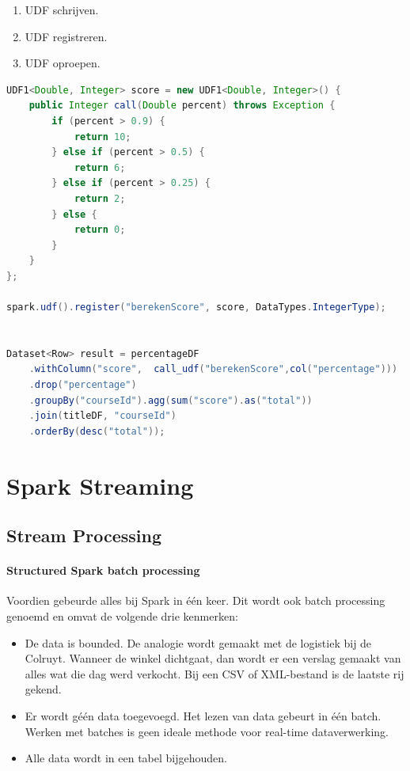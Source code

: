 \documentclass[a4paper,10pt,twoside]{report}
\begin{document}
\begin{enumerate}
	\item UDF schrijven.
	\item UDF registreren.
	\item UDF oproepen.
\end{enumerate}

\begin{lstlisting}[language=Java]
UDF1<Double, Integer> score = new UDF1<Double, Integer>() {
	public Integer call(Double percent) throws Exception {
		if (percent > 0.9) {
			return 10;
		} else if (percent > 0.5) {
			return 6;
		} else if (percent > 0.25) {
			return 2;
		} else {
			return 0;
		}
	}
};

spark.udf().register("berekenScore", score, DataTypes.IntegerType);


Dataset<Row> result = percentageDF
	.withColumn("score",  call_udf("berekenScore",col("percentage")))
	.drop("percentage")
	.groupBy("courseId").agg(sum("score").as("total"))
	.join(titleDF, "courseId")
	.orderBy(desc("total"));
\end{lstlisting}

\chapter{Spark Streaming}

\section{Stream Processing}

\subsubsection{Structured Spark batch processing}

Voordien gebeurde alles bij Spark in één keer. Dit wordt ook batch processing genoemd en omvat de volgende drie kenmerken:

\begin{itemize}
	\item De data is bounded. De analogie wordt gemaakt met de logistiek bij de Colruyt. Wanneer de winkel dichtgaat, dan wordt er een verslag gemaakt van alles wat die dag werd verkocht. Bij een CSV of XML-bestand is de laatste rij gekend.
	\item Er wordt géén data toegevoegd. Het lezen van data gebeurt in één batch. Werken met batches is geen ideale methode voor real-time dataverwerking.
	\item Alle data wordt in een tabel bijgehouden.
\end{itemize}
\end{document}
